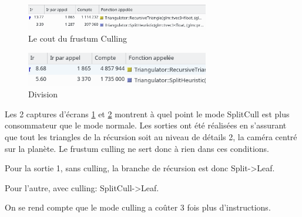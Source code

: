  
 \begin{figure}
        \centerline{\includegraphics[width=8cm]{img/noCullingVal.png}}
        \caption{Le cout du frustum Culling}
        \label{fig:perfNoCulling}
 \end{figure}
 
 \begin{figure}
        \centerline{\includegraphics[width=8cm]{img/cullingAfterFixValgrind.png}}
        \caption{Division}
        \label{fig:perfCulling}
 \end{figure}
 Les 2 captures d'écrans \ref{fig:perfNoCulling} et \ref{fig:perfCulling} montrent à quel point le mode SplitCull est plus consommateur que le mode normale.  Les sorties ont été réalisées en s'assurant que tout les triangles de la récursion soit au niveau de détails 2, la caméra centré sur la planète. Le frustum culling ne sert donc à rien dans ces conditions.
 
 
 Pour la sortie 1, sans culling, la branche de récursion est donc 
 \newline
 Split->Leaf.

Pour l'autre, avec culling:
 \newline
 SplitCull->Leaf.
 
 On se rend compte que le mode culling a coûter 3 fois plus d'instructions.
 